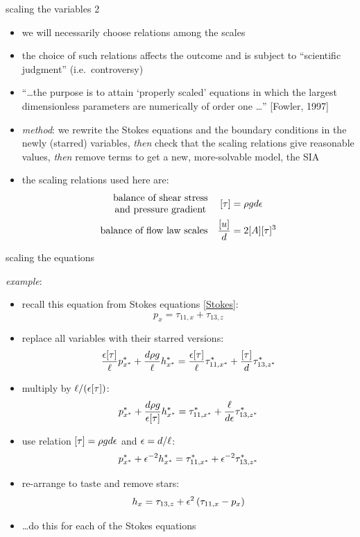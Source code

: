 \begin{frame}{scaling the variables 2}

\begin{itemize}
\item we will necessarily choose relations among the scales
\item the choice of such relations affects the outcome and is subject to ``scientific judgment'' (i.e.~controversy)
\item ``\dots the purpose is to attain `properly scaled' equations in which the largest dimensionless parameters are numerically of order one \dots'' [Fowler, 1997]\nocite{Fowler}
\item \emph{method}: we rewrite the Stokes equations and the boundary conditions in the newly (starred) variables, \emph{then} check that the scaling relations give reasonable values, \emph{then} remove terms to get a new, more-solvable model, the SIA
\item the scaling relations used here are:
\begin{align*}
\begin{matrix}
\text{balance of shear stress} \\
\text{and pressure gradient}
\end{matrix} && [\tau] &= \rho g d \epsilon \\
\text{balance of flow law scales} && \frac{[u]}{d} &= 2 [A] [\tau]^3
\end{align*}
\end{itemize}
\end{frame}


\begin{frame}{scaling the equations}

\small
\emph{example}:
\begin{itemize}
\item recall this equation from Stokes equations \eqref{Stokes}:
  $$p_x = \tau_{11,x} + \tau_{13,z}$$
\item replace all variables with their starred versions:
  $$\frac{\epsilon [\tau]}{\ell} p^*_{x^*}+ \frac{d \rho g}{\ell} h^*_{x^*} = \frac{\epsilon [\tau]}{\ell} \tau^*_{11,x^*} + \frac{[\tau]}{d}\tau^*_{13,z^*}$$
\item multiply by $\ell / (\epsilon [\tau])$:
  $$p^*_{x^*}+ \frac{d \rho g}{\epsilon [\tau]} h^*_{x^*} = \tau^*_{11,x^*} + \frac{\ell}{d \epsilon}\tau^*_{13,z^*}$$
\item use relation $[\tau] = \rho g d \epsilon$ and $\epsilon = d/\ell$:
  $$p^*_{x^*}+ \epsilon^{-2} h^*_{x^*} = \tau^*_{11,x^*} + \epsilon^{-2}\tau^*_{13,z^*}$$
\item re-arrange to taste and remove stars:
	$$h_x = \tau_{13,z} + \epsilon^2 \left(\tau_{11,x} - p_x\right)$$
\item \dots do this for each of the Stokes equations
\end{itemize}
\end{frame}


